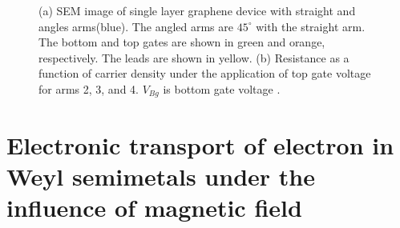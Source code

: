 \begin{figure}[H]
\begin{subfigure}[b]{0.35\linewidth}
            \caption{}
            \label{2fig:r vs v}
        \end{subfigure}
        \caption{(a) SEM image of single layer graphene device with straight and angles arms(blue). 
                    The angled arms are $45^{\circ}$ with the straight arm. 
                    The bottom and top gates are shown in green and orange, respectively. The leads are shown in yellow.
                    (b) Resistance as a function of carrier density under the application of top gate voltage for arms 2, 3, and 4. 
                    $V_{Bg}$ is bottom gate voltage \cite{Rahman2015}.}
        \label{2fig:angle dependent transmission}
    \end{figure}
\section{Electronic transport of electron in Weyl semimetals under the influence of magnetic field} \label{2sec:transport in B field}

